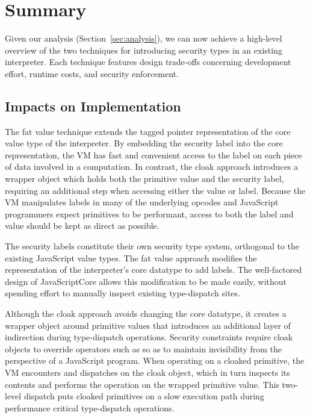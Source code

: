 \section{Summary}

Given our analysis (Section~\ref{sec:analysis}), we can now achieve a high-level overview of the two techniques for introducing security types in an existing interpreter.
Each technique features design trade-offs concerning development effort, runtime costs, and security enforcement.

\subsection{Impacts on Implementation}
The fat value technique extends the tagged pointer representation of the core value type of the interpreter.
By embedding the security label into the core representation, the VM has fast and convenient access to the label on each piece of data involved in a computation.
In contrast, the cloak approach introduces a wrapper object which holds both the primitive value and the security label, requiring an additional step when accessing either the value or label.
Because the VM manipulates labels in many of the underlying opcodes and JavaScript programmers expect primitives to be performant, access to both the label and value should be kept as direct as possible.

The security labels constitute their own security type system, orthogonal to the existing JavaScript value types.
The fat value approach modifies the representation of the interpreter's core datatype to add labels.
The well-factored design of JavaScriptCore allows this modification to be made easily, without spending effort to manually inspect existing type-dispatch sites.

Although the cloak approach avoids changing the core datatype, it creates a wrapper object around primitive values that introduces an additional layer of indirection during type-dispatch operations.
Security constraints require cloak objects to override operators such as  so as to maintain invisibility from the perspective of a JavaScript program.
When operating on a cloaked primitive, the VM encounters and dispatches on the cloak object, which in turn inspects its contents and performs the operation on the wrapped primitive value.
This two-level dispatch puts cloaked primitives on a slow execution path during performance critical type-dispatch operations.

